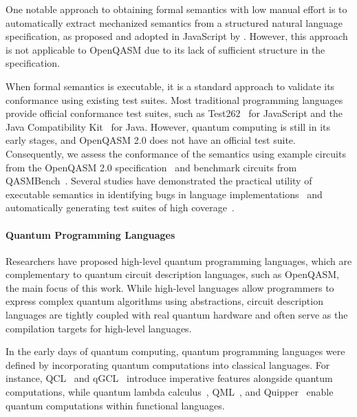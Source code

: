 One notable approach to obtaining formal semantics with low manual effort is to
automatically extract mechanized semantics from a structured natural language
specification, as proposed and adopted in JavaScript by \citet{park2021jiset}.
%
However, this approach is not applicable to OpenQASM due to its lack of
sufficient structure in the specification.

When formal semantics is executable, it is a standard approach to validate its
conformance using existing test suites.
%
Most traditional programming languages provide official conformance test
suites, such as Test262~\cite{test262} for JavaScript and the Java
Compatibility Kit~\cite{jck} for Java.
%
However, quantum computing is still in its early stages, and OpenQASM 2.0 does
not have an official test suite.
%
Consequently, we assess the conformance of the semantics using example circuits
from the OpenQASM 2.0 specification~\cite{openqasm2} and benchmark circuits
from QASMBench~\cite{li2023qasmbench}.
%
Several studies have demonstrated the practical utility of executable semantics
in identifying bugs in language
implementations~\cite{watt2023wasmref,schumi2021spectest,park2021jest} and
automatically generating test suites of high coverage~\cite{park2023feature}.

\paragraph{Quantum Programming Languages}

Researchers have proposed high-level quantum programming languages, which are
complementary to quantum circuit description languages, such as OpenQASM, the
main focus of this work.
%
While high-level languages allow programmers to express complex quantum
algorithms using abstractions, circuit description languages are tightly
coupled with real quantum hardware and often serve as the compilation targets
for high-level languages.

In the early days of quantum computing, quantum programming languages were
defined by incorporating quantum computations into classical languages.
%
For instance, QCL~\cite{omer2003structured} and qGCL~\cite{sanders2000quantum}
introduce imperative features alongside quantum computations, while quantum
lambda calculus~\cite{maymin1997extending},
QML~\cite{altenkirch2005functional}, and Quipper~\cite{green2013quipper} enable
quantum computations within functional languages.

